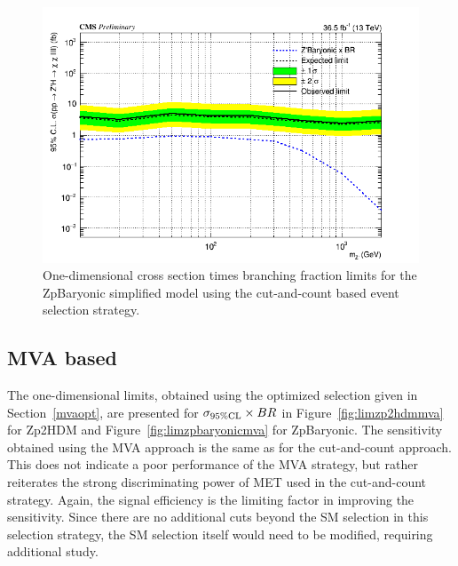 \begin{figure}[tbh]
\centering
\includegraphics[width=5in]{figures/sigma_limits_4mu_ZpBaryonic.png}
\caption{One-dimensional cross section times branching fraction limits for the ZpBaryonic simplified model using the cut-and-count based event selection strategy.}
\label{fig:limzpbaryonic}
\end{figure}

\subsection{MVA based}

The one-dimensional limits, obtained using the optimized selection given in Section~\ref{mvaopt}, are presented for $\sigma_{95\% \rm{CL}}\times BR$ in Figure~\ref{fig:limzp2hdmmva} for Zp2HDM and Figure~\ref{fig:limzpbaryonicmva} for ZpBaryonic. The sensitivity obtained using the MVA approach is the same as for the cut-and-count approach. This does not indicate a poor performance of the MVA strategy, but rather reiterates the strong discriminating power of MET used in the cut-and-count strategy. Again, the signal efficiency is the limiting factor in improving the sensitivity. Since there are no additional cuts beyond the SM selection in this selection strategy, the SM selection itself would need to be modified, requiring additional study. 


